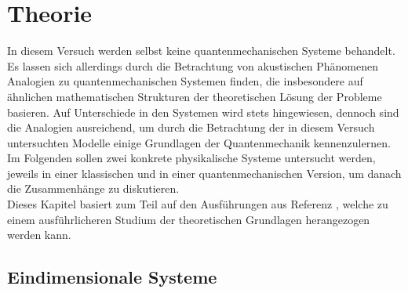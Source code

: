 \section{Theorie}
\label{sec:Theorie}
In diesem Versuch werden selbst keine quantenmechanischen Systeme behandelt. Es lassen sich allerdings durch die Betrachtung von akustischen Phänomenen Analogien zu quantenmechanischen Systemen finden, die insbesondere auf ähnlichen mathematischen Strukturen der theoretischen Lösung der Probleme basieren. Auf Unterschiede in den Systemen wird stets hingewiesen, dennoch sind die Analogien ausreichend, um durch die Betrachtung der in diesem Versuch untersuchten Modelle einige Grundlagen der Quantenmechanik kennenzulernen. Im Folgenden sollen zwei konkrete physikalische Systeme untersucht werden, jeweils in einer klassischen und in einer quantenmechanischen Version, um danach die Zusammenhänge zu diskutieren.\\
Dieses Kapitel basiert zum Teil auf den Ausführungen aus Referenz \cite{anderesProtokoll}, welche zu einem ausführlicheren Studium der theoretischen Grundlagen herangezogen werden kann.

\subsection{Eindimensionale Systeme}
\label{subsec:eindimsyst}
